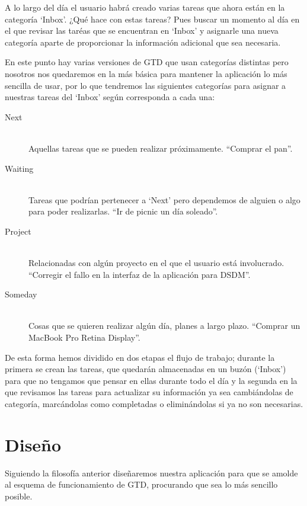 \documentclass[parskip=half*]{scrartcl}
\begin{document}
A lo largo del d\'ia el usuario habr\'a creado varias tareas que ahora est\'an en la categor\'ia `Inbox'. ¿Qu\'e hace con estas tareas? Pues buscar un momento al d\'ia en el que revisar las tar\'eas que se encuentran en `Inbox' y asignarle una nueva categor\'ia aparte de proporcionar la informaci\'on adicional que sea necesaria.

En este punto hay varias versiones de GTD que usan categor\'ias distintas pero nosotros nos quedaremos en la m\'as b\'asica para mantener la aplicaci\'on lo m\'as sencilla de usar, por lo que tendremos las siguientes categor\'ias para asignar a nuestras tareas del `Inbox' seg\'un corresponda a cada una:

\begin{description}
	\item[Next] \hfill \\ Aquellas tareas que se pueden realizar pr\'oximamente. ``Comprar el pan''.
	\item[Waiting] \hfill \\ Tareas que podr\'ian pertenecer a `Next' pero dependemos de alguien o algo para poder realizarlas. ``Ir de picnic un d\'ia soleado''.
	\item[Project] \hfill \\ Relacionadas con alg\'un proyecto en el que el usuario est\'a involucrado. ``Corregir el fallo en la interfaz de la aplicaci\'on para DSDM''.
	\item[Someday] \hfill \\ Cosas que se quieren realizar alg\'un d\'ia, planes a largo plazo. ``Comprar un MacBook Pro Retina Display''.
\end{description}

De esta forma hemos dividido en dos etapas el flujo de trabajo; durante la primera se crean las tareas, que quedar\'an almacenadas en un buz\'on (`Inbox') para que no tengamos que pensar en ellas durante todo el d\'ia y la segunda en la que revisamos las tareas para actualizar su informaci\'on ya sea cambi\'andolas de categor\'ia, marc\'andolas como completadas o elimin\'andolas si ya no son necesarias.

\section{Dise\~no}

Siguiendo la filosof\'ia anterior dise\~naremos nuestra aplicaci\'on para que se amolde al esquema de funcionamiento de GTD, procurando que sea lo m\'as sencillo posible.
\end{document}
